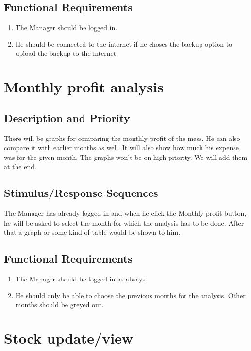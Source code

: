 \documentclass{scrreprt}
\begin{document}
\subsection{Functional Requirements}
\begin{enumerate}
\item The Manager should be logged in. 
\item He should be connected to the internet if he choses the backup option to upload the backup to the internet.
\end{enumerate}

\section{Monthly profit analysis}

\subsection{Description and Priority}
There will be graphs for comparing the monthly profit of the mess. He can also compare it with earlier months as well. It will also show how much his expense was for the given month. The graphs won't be on high priority. We will add them at the end.

\subsection{Stimulus/Response Sequences}
The Manager has already logged in and when he click the Monthly profit button, he will be asked to select the month for which the analysis has to be done. After that a graph or some kind of table would be shown to him.

\subsection{Functional Requirements}
\begin{enumerate}
    \item The Manager should be logged in as always.
    \item He should only be able to choose the previous months for the analysis. Other months should be greyed out.
\end{enumerate}

\section{Stock update/view}
\end{document}
